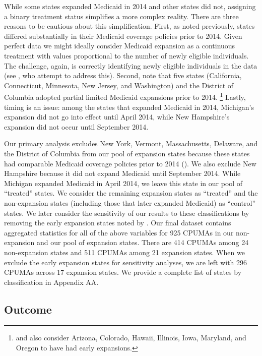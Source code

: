 \documentclass[aoas]{imsart}
\theoremstyle{plain}
\theoremstyle{remark}
\begin{document}
While some states expanded Medicaid in 2014 and other states did not, assigning a binary treatment status simplifies a more complex reality. There are three reasons to be cautious about this simplification. First, as noted previously, states differed substantially in their Medicaid coverage policies prior to 2014. Given perfect data we might ideally consider Medicaid expansion as a continuous treatment with values proportional to the number of newly eligible individuals. The challenge, again, is correctly identifying newly eligible individuals in the data (see \cite{frean2017premium}, who attempt to address this). Second, \cite{frean2017premium} note that five states (California, Connecticut, Minnesota, New Jersey, and Washington) and the District of Columbia adopted partial limited Medicaid expansions prior to 2014. \footnote{\cite{kaestner2017effects} and \cite{courtemanche2017early} also consider Arizona, Colorado, Hawaii, Illinois, Iowa, Maryland, and Oregon to have had early expansions.} Lastly, timing is an issue: among the states that expanded Medicaid in 2014, Michigan's expansion did not go into effect until April 2014, while New Hampshire's expansion did not occur until September 2014.

Our primary analysis excludes New York, Vermont, Massachusetts, Delaware, and the District of Columbia from our pool of expansion states because these states had comparable Medicaid coverage policies prior to 2014 (\cite{kaestner2017effects}). We also exclude New Hampshire because it did not expand Medicaid until September 2014. While Michigan expanded Medicaid in April 2014, we leave this state in our pool of ``treated'' states. We consider the remaining expansion states as ``treated'' and the non-expansion states (including those that later expanded Medicaid) as ``control'' states. We later consider the sensitivity of our results to these classifications by removing the early expansion states noted by \cite{frean2017premium}. Our final dataset contains aggregated statistics for all of the above variables for 925 CPUMAs in our non-expansion and our pool of expansion states. There are 414 CPUMAs among 24 non-expansion states and 511 CPUMAs among 21 expansion states. When we exclude the early expansion states for sensitivity analyses, we are left with 296 CPUMAs across 17 expansion states. We provide a complete list of states by classification in Appendix AA.

\subsection{Outcome}
\end{document}
